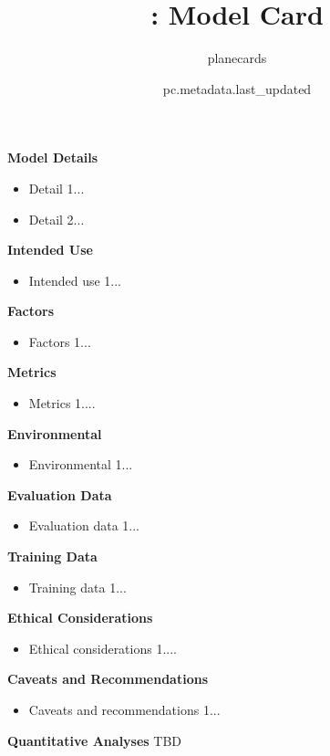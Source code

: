 \documentclass{article}
\title{\VAR{pc.metadata.name}: Model Card}
\author{planecards}
\date{pc.metadata.last_updated}
\begin{document}
\newenvironment{mcsection}[1]
    {
        \textbf{#1}


        \begin{itemize}[leftmargin=*,topsep=0pt,itemsep=-1ex,partopsep=1ex,parsep=1ex,after=\vspace{\medskipamount}]
    }
    {
        \end{itemize}
    }

\begin{adjustwidth}{-60pt}{-30pt}
\begin{singlespace}

\begin{tcolorbox}[title=\textbf{\VAR{pc.metadata.name} : Model Card},
    breakable, sharp corners, boxrule=0.7pt]

\begin{mcsection}{Model Details}
    \item Detail 1...
    \item Detail 2...
\end{mcsection}

\begin{mcsection}{Intended Use}
    \item Intended use 1...
\end{mcsection}

\begin{mcsection}{Factors}
    \item Factors 1...
\end{mcsection}

\begin{mcsection}{Metrics}
    \item Metrics 1....
\end{mcsection}

\begin{mcsection}{Environmental}
    \item Environmental 1...
\end{mcsection}

\begin{mcsection}{Evaluation Data}
    \item Evaluation data 1...
\end{mcsection}

\begin{mcsection}{Training Data}
    \item Training data 1...
\end{mcsection}

\begin{mcsection}{Ethical Considerations}
    \item Ethical considerations 1....
\end{mcsection}

\begin{mcsection}{Caveats and Recommendations}
    \item Caveats and recommendations 1...
\end{mcsection}

\textbf{Quantitative Analyses}
TBD
\end{tcolorbox}
\end{singlespace}
\end{adjustwidth}
\end{document}
